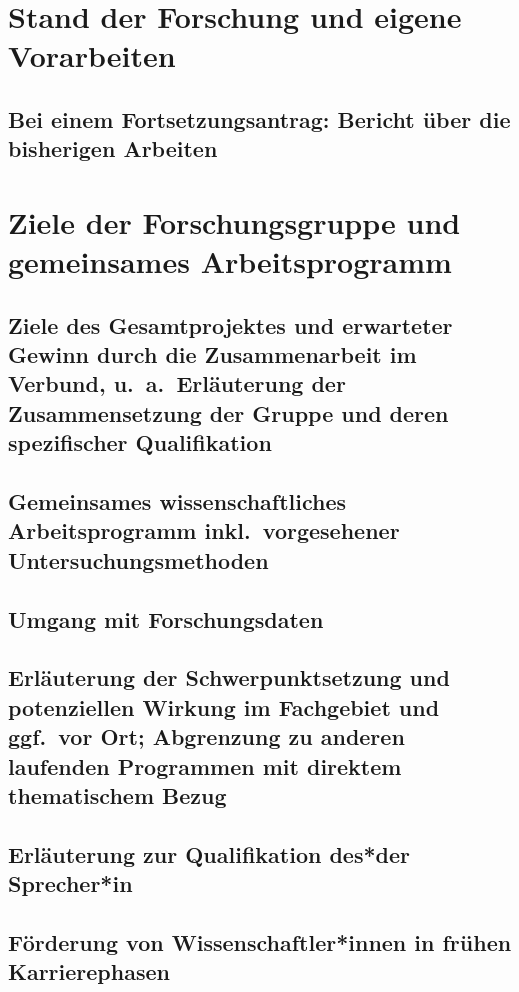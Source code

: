 \documentclass[german, 53.02]{proposal}
\begin{document}
\section{Stand der Forschung und eigene Vorarbeiten}

\subsection{Bei einem Fortsetzungsantrag: Bericht über die bisherigen Arbeiten}

\section{Ziele der \clinical{}Forschungsgruppe und gemeinsames Arbeitsprogramm}

\subsection{Ziele des Gesamtprojektes und erwarteter Gewinn durch die Zusammenarbeit im Verbund, u.\ a.\ Erläuterung der Zusammensetzung der Gruppe und deren spezifischer Qualifikation}

\subsection{Gemeinsames wissenschaftliches Arbeitsprogramm inkl.\ vorgesehener Untersuchungsmethoden}

\subsection{Umgang mit Forschungsdaten}

\subsection{Erläuterung der Schwerpunktsetzung und potenziellen Wirkung im Fachgebiet und ggf.\ vor Ort; Abgrenzung zu anderen laufenden Programmen mit direktem thematischem Bezug}

\subsection{Erläuterung zur Qualifikation des*der Sprecher*in}

\subsection{Förderung von Wissenschaftler*innen in frühen Karrierephasen}
\end{document}
